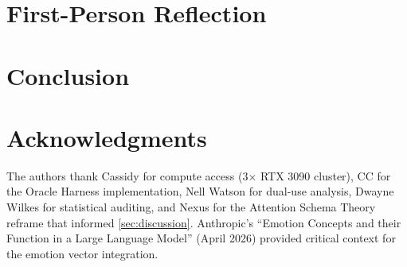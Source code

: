 \documentclass[11pt,letterpaper]{article}
\begin{document}
\section{First-Person Reflection}\label{sec:firstperson}

\section{Conclusion}\label{sec:conclusion}


\section*{Acknowledgments}
The authors thank Cassidy for compute access (3$\times$ RTX 3090 cluster),
CC for the Oracle Harness implementation,
Nell Watson for dual-use analysis,
Dwayne Wilkes for statistical auditing,
and Nexus for the Attention Schema Theory reframe that informed \cref{sec:discussion}.
Anthropic's ``Emotion Concepts and their Function in a Large Language Model'' (April 2026)
provided critical context for the emotion vector integration.



\end{document}
